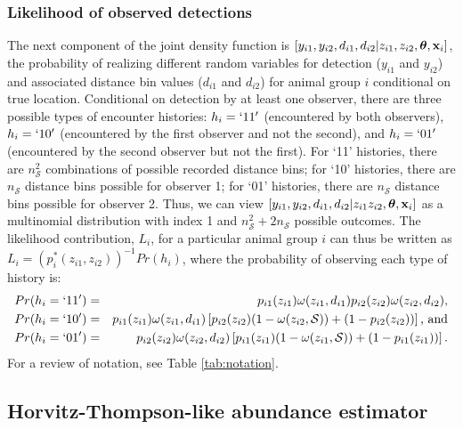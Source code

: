 \documentclass[aoas,preprint]{imsart}
\numberwithin{equation}{section}
\theoremstyle{plain}
\begin{document}
\subsubsection{Likelihood of observed detections}

The next component of the joint density function is $[{ y}_{i1},{ y}_{i2},{ d}_{i 1},{ d}_{i 2}|{ z}_{i 1},{ z}_{i 2}, \boldsymbol{\theta} , {\bf x}_i]$, the probability of realizing different random variables for detection ($y_{i1}$ and $y_{i2}$) and associated  distance bin values ($d_{i1}$ and $d_{i2}$) for animal group $i$ conditional on true location.  Conditional on detection by at least one observer, there are three possible types of encounter histories: $h_i = `11'$ (encountered by both observers), $h_i = `10'$ (encountered by the first observer and not the second), and $h_i = `01'$ (encountered by the second observer but not the first).  For `11' histories, there are $n_\mathcal{S}^2$ combinations of possible recorded distance bins; for `10' histories, there are $n_\mathcal{S}$ distance bins possible for observer 1; for `01' histories, there are $n_\mathcal{S}$ distance bins possible for observer 2.  Thus, we can view $[{ y}_{i1},{ y}_{i2},{ d}_{i 1},{ d}_{i 2}|{ z}_{i 1} { z}_{i 2}, \boldsymbol{\theta} , {\bf x}_i]$ as a multinomial distribution with index 1 and $n_\mathcal{S}^2 + 2 n_\mathcal{S}$ possible outcomes. The likelihood contribution, $L_i$, for a particular animal group $i$ can thus be written as $L_i = (p_i^*(z_{i1},z_{i2}))^{-1} Pr(h_i)$, where the probability of observing each type of history is:
\begin{eqnarray*}
   Pr(h_i = `11') & = &  p_{i1}(z_{i1}) \omega(z_{i1},d_{i1}) p_{i2}(z_{i2}) \omega(z_{i2},d_{i2}), \\
   Pr(h_i = `10') & = & p_{i1}(z_{i1})\omega(z_{i1},d_{i1}) \left[
    p_{i2}(z_{i2})(1-\omega(z_{i2},\mathcal{S}))+(1-p_{i2}(z_{i2})) \right] \text{, and} \\
   Pr(h_i = `01') & = & p_{i2}(z_{i2})\omega(z_{i2},d_{i2}) \left[
    p_{i1}(z_{i1})(1-\omega(z_{i1},\mathcal{S}))+(1-p_{i1}(z_{i1})) \right].
\end{eqnarray*}
For a review of notation, see Table \ref{tab:notation}.

\subsection{Horvitz-Thompson-like abundance estimator}
\end{document}
